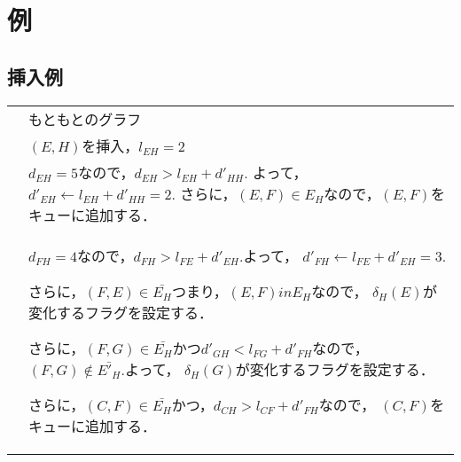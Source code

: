 \chapter{例}

\bgroup
\setlength{\fboxrule}{0pt}
\setlength{\fboxsep}{10pt}

\section{挿入例}

\begin{tabular}{cp{8cm}}
  \raisebox{-.8\totalheight}{\fbox{
    \def\svgwidth{.35\linewidth}
    
  }}
  &
  もともとのグラフ
  \\
  \raisebox{-.8\totalheight}{\fbox{
    \def\svgwidth{.35\linewidth}
    
  }}
  &
  $(E,H)$を挿入，$l_{EH}=2$
  \\
  \raisebox{-.8\totalheight}{\fbox{
    \def\svgwidth{.35\linewidth}
    
  }}
  &
  $d_{EH}=5$なので，$d_{EH}>l_{EH}+d'_{HH}$.
  よって，$d'_{EH}\gets l_{EH}+d'_{HH}=2$.
  さらに，$(E,F)\in E_H$なので，$(E,F)$をキューに追加する．
  \\
  \raisebox{-.8\totalheight}{\fbox{
    \def\svgwidth{.35\linewidth}
    
  }}
  &
  $d_{FH}=4$なので，$d_{FH}>l_{FE}+d'_{EH}$.よって，
  $d'_{FH}\gets l_{FE}+d'_{EH}=3$.

  さらに，$(F,E)\in \bar{E_H}$つまり，$(E,F)in E_H$なので，
  $\delta_H(E)$が変化するフラグを設定する．

  さらに，$(F,G)\in\bar{E_H}$かつ$d'_{GH}<l_{FG}+d'_{FH}$なので，
  $(F,G)\notin \bar{E'_H}$.よって，
  $\delta_H(G)$が変化するフラグを設定する．

  さらに，$(C,F)\in\bar{E_H}$かつ，$d_{CH}\gt l_{CF}+d'_{FH}$なので，
  $(C,F)$をキューに追加する．
\end{tabular}
\newpage
